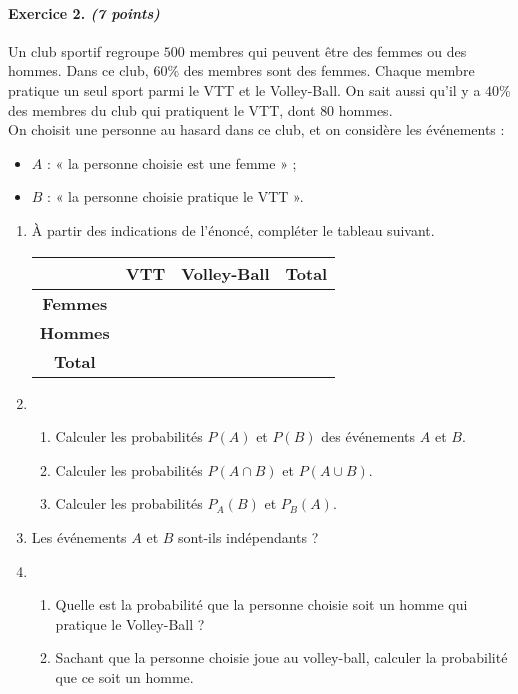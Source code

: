 \documentclass[11pt]{article}
\begin{document}
\newpage
\paragraph{Exercice 2. \emph{(7 points)}} Un club sportif regroupe $500$ membres qui peuvent être
des femmes ou des hommes. Dans ce club, $60$\% des membres sont des femmes.
Chaque membre pratique un seul sport parmi le VTT et le Volley-Ball. On sait
aussi qu'il y a $40$\% des membres du club qui pratiquent le VTT, dont
$80$ hommes.\\
On choisit une personne au hasard dans ce club, et on considère les événements :
\begin{itemize}
  \item $A$ : « la personne choisie est une femme » ;
  \item $B$ : « la personne choisie pratique le VTT ».
\end{itemize}
\begin{enumerate}
      \item À partir des indications de l'énoncé, compléter le tableau suivant.
    \begin{center}
      \def\arraystretch{1.5}
    \begin{tabular}{|c|c|c|c|}
      \hline
      & \textbf{VTT} & \textbf{Volley-Ball} & \textbf{Total} \\
      \hline
      \textbf{Femmes} & & & \\
      \hline
      \textbf{Hommes} & & & \\
      \hline
      \textbf{Total} & & & \\
      \hline
    \end{tabular}
    \end{center}
  \item \begin{enumerate}
      \item Calculer les probabilités $P(A)$ et $P(B)$ des événements $A$ et
        $B$.
      \item Calculer les probabilités $P(A\cap B)$ et $P(A\cup B)$.
      \item Calculer les probabilités $P_A(B)$ et $P_B(A)$.
    \end{enumerate}
  \item Les événements $A$ et $B$ sont-ils indépendants ?
  \item \begin{enumerate}
      \item Quelle est la probabilité que la personne choisie soit un homme qui
        pratique le Volley-Ball ?
      \item Sachant que la personne choisie joue au volley-ball, calculer la
        probabilité que ce soit un homme.
    \end{enumerate}
\end{enumerate}
\end{document}
